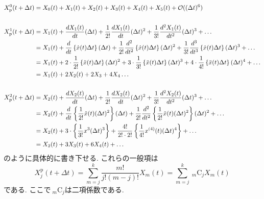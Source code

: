 \begin{align}
  X_{\mathrm{p}}^{0} (t + \Delta t)
  &=
  X_{0}(t) + X_{1}(t) + X_{2}(t) +
  X_{3}(t) + X_{4}(t) + X_{5}(t) + \mathcal{O}((\Delta t)^6)
  \notag \\ \notag \\
  X_{\mathrm{p}}^{1} (t + \Delta t)
  &=
  X_{1}(t)
  + \frac{d X_{1}(t)}{dt} (\Delta t)
  + \frac{1}{2!} \frac{d X_{1}(t)}{dt} (\Delta t)^{2}
  + \frac{1}{3!} \frac{d^{2} X_{1}(t)}{dt^{2}} (\Delta t)^{3}
  + \ldots
  \notag \\
  &=
  X_{1}(t)
  + \frac{d}{dt}                    \left\{\dot{x}(t) \Delta t \right\}(\Delta t)
  + \frac{1}{2!} \frac{d^{2}}{dt^2} \left\{\dot{x}(t) \Delta t \right\}(\Delta t)^{2}
  + \frac{1}{3!} \frac{d^{3}}{dt^3} \left\{\dot{x}(t) \Delta t \right\}(\Delta t)^{3}
  + \ldots
  \notag \\
  &=
  X_{1}(t)
  + 2 \cdot \frac{1}{2!} \left\{\ddot{x}(t) \Delta t \right\}(\Delta t)^{2}
  + 3 \cdot \frac{1}{3!} \left\{\ddot{x}(t) \Delta t \right\}(\Delta t)^{3}
  + 4 \cdot \frac{1}{4!} \left\{\ddot{x}(t) \Delta t \right\}(\Delta t)^{4}
  + \ldots
  \notag \\
  &=
  X_{1}(t) + 2 X_{2} (t) + 2 X_{3} + 4 X_{4} \ldots
  \notag \\ \notag \\
  X_{\mathrm{p}}^{2} (t + \Delta t)
  &=
  X_{2}(t)
  + \frac{d X_{2}(t)}{dt} (\Delta t)
  + \frac{1}{2!} \frac{d X_{2}(t)}{dt} (\Delta t)^{2}
  + \frac{1}{3!} \frac{d^{2} X_{2}(t)}{dt^{2}} (\Delta t)^{3}
  + \ldots
  \notag \\
  &=
  X_{2}(t)
  + \frac{d}{dt} 
    \left\{
      \frac{1}{2!}
      \ddot{x}(t) (\Delta t)^{2}
    \right\}(\Delta t)
  + \frac{1}{2!} \frac{d^{2}}{dt^2}
    \left\{
      \frac{1}{2!}
      \ddot{x}(t) (\Delta t)^{2}
    \right\}(\Delta t)^{2}
  + \ldots
  \notag \\
  &=
  X_{2}(t)
  + 3 \cdot \left\{\frac{1}{3!} x^{3} (\Delta t)^{3} \right\}
  + \frac{4!}{2! \cdot 2!}\left\{ \frac{1}{4!} x^{(4)} (t) (\Delta t)^{4}\right\}
  + \ldots
  \notag \\
  &=
  X_{2}(t) + 3 X_{3}(t) + 6 X_{4}(t) + \ldots
  \notag
\end{align}
のように具体的に書き下せる. これらの一般項は
\begin{equation}
  X_{j}^{\mathrm{p}}(t + \Delta t)
  =
  \sum_{m=j}^{k} \frac{m!}{j! (m-j)!} X_{m} (t)
  =
  \sum_{m=j}^{k} ~_m\mathrm{C}_{j} X_{m} (t)
\end{equation}
である. ここで$~_m\mathrm{C}_{j}$は二項係数である.
